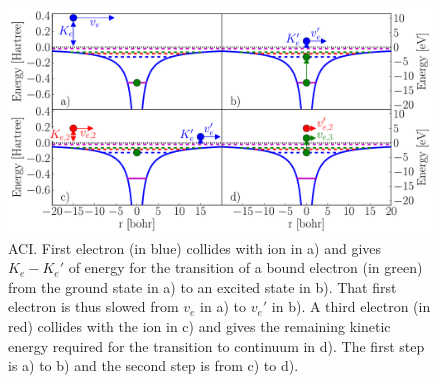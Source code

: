 \begin{figure}
 \centering
 \includegraphics[width=\figurewidth]{figures/ionization_aci}
 \caption{ACI. First electron (in blue) collides with ion in a) and gives
          $K_e - K_e'$ of energy for the transition of a bound electron (in green)
          from the ground state in a) to an excited state in b). That first
          electron is thus slowed from $v_e$ in a) to $v_e'$ in b). A third electron
          (in red) collides with the ion in c) and gives the remaining kinetic
          energy required for the transition to continuum in d). The first step
          is a) to b) and the second step is from c) to d).}
 \label{fig:ionization:aci}
\end{figure}



